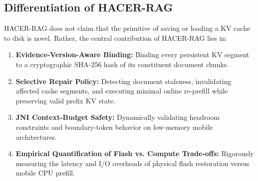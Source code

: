 \subsection{Differentiation of HACER-RAG}
HACER-RAG does not claim that the primitive of saving or loading a KV cache to disk is novel. Rather, the central contribution of HACER-RAG lies in:
\begin{enumerate}
    \item \textbf{Evidence-Version-Aware Binding:} Binding every persistent KV segment to a cryptographic SHA-256 hash of its constituent document chunks.
    \item \textbf{Selective Repair Policy:} Detecting document staleness, invalidating affected cache segments, and executing minimal online re-prefill while preserving valid prefix KV state.
    \item \textbf{JNI Context-Budget Safety:} Dynamically validating headroom constraints and boundary-token behavior on low-memory mobile architectures.
    \item \textbf{Empirical Quantification of Flash vs. Compute Trade-offs:} Rigorously measuring the latency and I/O overheads of physical flash restoration versus mobile CPU prefill.
\end{enumerate}
